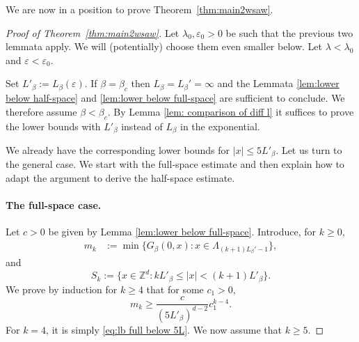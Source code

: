 \documentclass[11pt,a4paper]{article}
\numberwithin{equation}{section}
\theoremstyle{plain}
\theoremstyle{definition}
\begin{document}
We are now in a position to prove Theorem~\ref{thm:main2wsaw}.
\begin{proof}[Proof of Theorem~\textup{\ref{thm:main2wsaw}}] Let $\lambda_0,\varepsilon_0>0$ be such that the previous two lemmata apply. We will (potentially) choose them even smaller below. Let $\lambda<\lambda_0$ and $\varepsilon<\varepsilon_0$.

Set $L'_\beta:=L_\beta(\varepsilon)$. If $\beta=\beta_c$ then $L_\beta=L_\beta'=\infty$ and the Lemmata \ref{lem:lower below half-space} and \ref{lem:lower below full-space} are sufficient to conclude. We therefore assume $\beta<\beta_c$. By Lemma \ref{lem: comparison of diff l} it suffices to prove the lower bounds with $L'_\beta$ instead of $L_\beta$ in the exponential.

We already have the corresponding lower bounds for $|x|\le 5L'_\beta$. Let us turn to the general case. We start with the full-space estimate and then explain how to adapt the argument to derive the half-space estimate.
\paragraph{The full-space case.} Let $c>0$ be given by Lemma \ref{lem:lower below full-space}. Introduce, for $k\ge0$, 
\begin{align}
m_k&:=\min\{G_\beta(0,x):x\in \Lambda_{(k+1)L_\beta'-1}\},
\end{align}
and 
\begin{equation}
S_k:=\{x\in\mathbb Z^d:kL'_\beta\le |x|<(k+1)L'_\beta\}.
\end{equation}
We prove by induction for $k\ge 4$ that for some $c_1>0$,
\begin{equation}
m_k\ge \frac{c}{(5L'_\beta)^{d-2}}c_1^{k-4}.
\end{equation}
For $k=4$, it is simply \eqref{eq:lb full below 5L}. We now assume that $k\ge 5$.


\end{proof}
\end{document}
